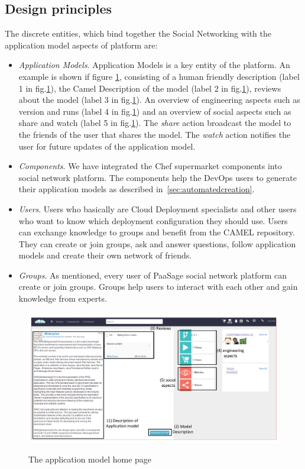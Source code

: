 \subsection{Design principles}
The discrete entities, which bind together the Social Networking with the application model aspects of platform are:
\begin{itemize}
\item \emph{Application Models}. Application Models is a key entity of the platform. An example is shown if figure \ref{fig:jenter_home}, consisting of a human friendly description (label 1 in fig.\ref{fig:jenter_home}), the Camel Description of the model (label 2 in fig.\ref{fig:jenter_home}), reviews about the model (label 3 in fig.\ref{fig:jenter_home}). An overview of engineering aspects such as version and runs (label 4 in fig.\ref{fig:jenter_home}) and an overview of social aspects such as share and watch (label 5 in fig.\ref{fig:jenter_home}). The {\it share} action broadcast the model to the friends of the user that shares the model. The {\it watch} action notifies the user for future updates of the application model. 
\item \emph{Components}. We have integrated the Chef supermarket components into social network platform. The components help the DevOps users to generate their application models as described in~\ref{sec:automatedcreation}. 
\item \emph{Users}. Users who basically are Cloud Deployment specialists and other users who want to know which deployment configuration they should use. Users can exchange knowledge to groups and benefit from the CAMEL repository. They can create or join groups, ask and answer questions, follow application models and create their own network of friends.
\item \emph{Groups}. As mentioned, every user of PaaSage social network platform can create or join groups. Groups help users to interact with each other and gain knowledge from experts.
\end{itemize}

\begin{figure}[h]
	\caption{The application model home page}
	\includegraphics[width=1\textwidth,natwidth=200,natheight=150]{./fig/jenterprise_home_page.pdf}
	\centering
	\label{fig:jenter_home}
\end{figure}

